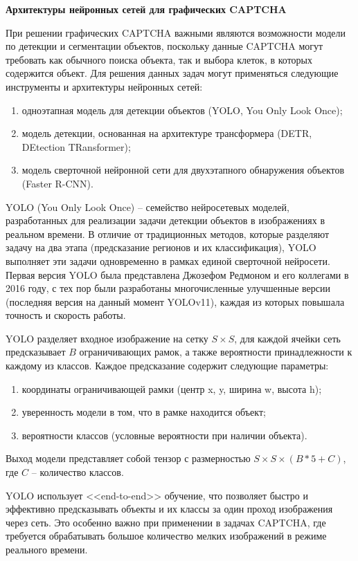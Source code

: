 \textbf{Архитектуры нейронных сетей для графических CAPTCHA}

При решении графических CAPTCHA важными являются возможности модели по детекции
и сегментации объектов, поскольку данные CAPTCHA могут требовать как обычного 
поиска объекта, так и выбора клеток, в которых содержится объект. Для решения 
данных задач могут применяться следующие инструменты и архитектуры нейронных 
сетей:

\begin{enumerate}
    \item одноэтапная модель для детекции объектов (YOLO, You Only Look Once);
    \item модель детекции, основанная на архитектуре трансформера (DETR, 
    DEtection TRansformer);
    \item модель сверточной нейронной сети для двухэтапного обнаружения объектов 
    (Faster R-CNN).
\end{enumerate}

YOLO (You Only Look Once) -- семейство нейросетевых моделей, разработанных для 
реализации задачи детекции объектов в изображениях в реальном времени. В отличие 
от традиционных методов, которые разделяют задачу на два этапа (предсказание 
регионов и их классификация), YOLO выполняет эти задачи одновременно в рамках 
единой сверточной нейросети. Первая версия YOLO была представлена Джозефом 
Редмоном и его коллегами в 2016 году, с тех пор были разработаны многочисленные 
улучшенные версии (последняя версия на данный момент YOLOv11), каждая из которых 
повышала точность и скорость работы.

YOLO разделяет входное изображение на сетку $S \times S$, для каждой ячейки сеть 
предсказывает $B$ ограничивающих рамок, а также вероятности принадлежности к 
каждому из классов. Каждое предсказание содержит следующие параметры:

\begin{enumerate}
    \item координаты ограничивающей рамки (центр x, y, ширина w, высота h);
    \item уверенность модели в том, что в рамке находится объект;
    \item вероятности классов (условные вероятности при наличии объекта).
\end{enumerate}

Выход модели представляет собой тензор с размерностью $S \times S \times (B * 5 + 
C)$, где $C$ -- количество классов.

YOLO использует <<end-to-end>> обучение, что позволяет быстро и эффективно 
предсказывать объекты и их классы за один проход изображения через сеть. Это 
особенно важно при применении в задачах CAPTCHA, где требуется обрабатывать 
большое количество мелких изображений в режиме реального времени.

